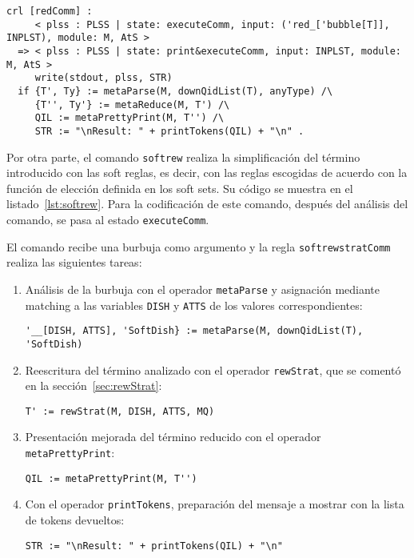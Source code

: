 \begin{lstlisting}[language=Maude,label={lst:red},caption={Comando \texttt{red} en PLSS.}]
 crl [redComm] :
     < plss : PLSS | state: executeComm, input: ('red_['bubble[T]], INPLST), module: M, AtS >
  => < plss : PLSS | state: print&executeComm, input: INPLST, module: M, AtS >
     write(stdout, plss, STR)
  if {T', Ty} := metaParse(M, downQidList(T), anyType) /\
     {T'', Ty'} := metaReduce(M, T') /\
     QIL := metaPrettyPrint(M, T'') /\
     STR := "\nResult: " + printTokens(QIL) + "\n" .
\end{lstlisting}
\bigskip




Por otra parte, el comando \texttt{softrew} realiza la simplificación del término introducido con las soft reglas, es decir, con las reglas escogidas de acuerdo con la función de elección definida en los soft sets.
Su código se muestra en el listado~\ref{lst:softrew}.
%
Para la codificación de este comando, después del análisis del comando, se pasa al estado \texttt{executeComm}.

El comando recibe una burbuja como argumento y la regla \texttt{softrewstratComm} realiza las siguientes tareas:

\begin{enumerate}
\item Análisis de la burbuja con el operador \texttt{metaParse} y asignación mediante matching a las variables \texttt{DISH} y \texttt{ATTS} de los valores correspondientes:
\begin{lstlisting}[language=Maude]
  '__[DISH, ATTS], 'SoftDish} := metaParse(M, downQidList(T), 'SoftDish)
\end{lstlisting}

\item Reescritura del término analizado con el operador \texttt{rewStrat}, que se comentó en la sección~\ref{sec:rewStrat}:
\begin{lstlisting}[language=Maude]
     T' := rewStrat(M, DISH, ATTS, MQ)
\end{lstlisting}

\item Presentación mejorada del término reducido con el operador \texttt{metaPrettyPrint}:
\begin{lstlisting}[language=Maude]
     QIL := metaPrettyPrint(M, T'')
\end{lstlisting}

\item Con el operador \texttt{printTokens}, preparación del mensaje a mostrar con la lista de tokens devueltos:
\begin{lstlisting}[language=Maude]
     STR := "\nResult: " + printTokens(QIL) + "\n" 
\end{lstlisting}
\end{enumerate}
\smallskip

